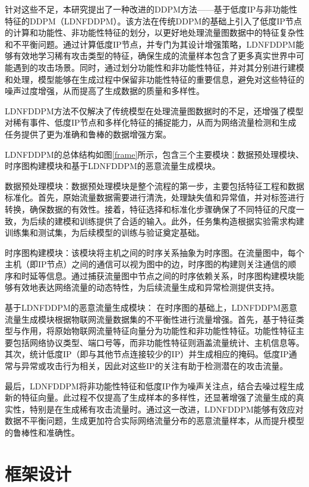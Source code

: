 \documentclass[promaster]{thesis-uestc}
\begin{document}
针对这些不足，本研究提出了一种改进的DDPM方法——基于低度IP与非功能性特征的DDPM（LDNFDDPM）。该方法在传统DDPM的基础上引入了低度IP节点的计算和功能性、非功能性特征的划分，以更好地处理流量图数据中的特征复杂性和不平衡问题。通过计算低度IP节点，并专门为其设计增强策略，LDNFDDPM能够有效地学习稀有攻击类型的特征，确保生成的流量样本包含了更多真实世界中可能遇到的攻击场景。同时，通过划分功能性和非功能性特征，并对其分别进行建模和处理，模型能够在生成过程中保留非功能性特征的重要信息，避免对这些特征的噪声过度增强，从而提高了生成数据的质量和多样性。

LDNFDDPM方法不仅解决了传统模型在处理流量图数据时的不足，还增强了模型对稀有事件、低度IP节点和多样化特征的捕捉能力，从而为网络流量检测和生成任务提供了更为准确和鲁棒的数据增强方案。


LDNFDDPM的总体结构如图\ref{frame}所示，包含三个主要模块：数据预处理模块、时序图构建模块和基于LDNFDDPM的恶意流量生成模块。

数据预处理模块：数据预处理模块是整个流程的第一步，主要包括特征工程和数据标准化。首先，原始流量数据需要进行清洗，处理缺失值和异常值，并对标签进行转换，确保数据的有效性。接着，特征选择和标准化步骤确保了不同特征的尺度一致，为后续的建模和训练提供了合适的输入。此外，任务集构造根据实验需求构建训练集和测试集，为后续模型的训练与验证奠定基础。

时序图构建模块：该模块将主机之间的时序关系抽象为时序图。在流量图中，每个主机（即IP节点）之间的通信可以视为图中的边，时序图的构建则关注通信的顺序和时延等信息。通过捕获流量图中节点之间的时序依赖关系，时序图构建模块能够有效地表达网络流量的动态特性，为后续流量生成和异常检测提供支持。

基于LDNFDDPM的恶意流量生成模块： 在时序图的基础上，LDNFDDPM恶意流量生成模块根据物联网流量数据集的不平衡性进行流量增强。首先，基于特征类型与作用，将原始物联网流量特征向量分为功能性和非功能性特征。功能性特征主要包括网络协议类型、端口号等，而非功能性特征则涵盖流量统计、主机信息等。其次，统计低度IP（即与其他节点连接较少的IP）并生成相应的掩码。低度IP通常与异常或攻击行为相关，因此对这些IP的关注有助于检测潜在的攻击流量。

最后，LDNFDDPM将非功能性特征和低度IP作为噪声关注点，结合去噪过程生成新的特征向量。此过程不仅提高了生成样本的多样性，还显著增强了流量生成的真实性，特别是在生成稀有攻击流量时。通过这一改进，LDNFDDPM能够有效应对数据不平衡问题，生成更加符合实际网络流量分布的恶意流量样本，从而提升模型的鲁棒性和准确性。
\section{框架设计}
\end{document}
